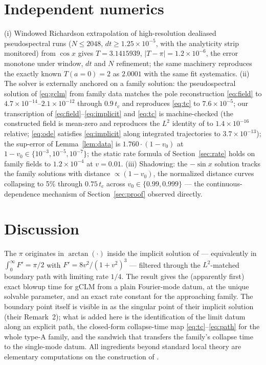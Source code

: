 \documentclass[11pt,a4paper]{article}
\theoremstyle{plain}
\theoremstyle{definition}
\theoremstyle{plain}
\newcommand{\abs}[1]{\lvert #1 \rvert}
\begin{document}
\section{Independent numerics}\label{sec:numerics}

(i) Windowed Richardson extrapolation of high-resolution dealiased pseudospectral runs ($N\le2048$, $dt\ge1.25\times10^{-5}$, with the analyticity strip monitored) from $\cos x$ gives $T=3.1415939$, $\abs{T-\pi}=1.2\times10^{-6}$, the error monotone under window, $dt$ and $N$ refinement; the same machinery reproduces the exactly known $T(a=0)=2$ as $2.0001$ with the same fit systematics. (ii) The solver is externally anchored on a family solution: the pseudospectral solution of \eqref{eq:gclm} from family data matches the pole reconstruction \eqref{eq:field} to $4.7\times10^{-14}$--$2.1\times10^{-12}$ through $0.9\,t_c$ and reproduces \eqref{eq:tc} to $7.6\times10^{-5}$; our transcription of \eqref{eq:field}--\eqref{eq:implicit} and \eqref{eq:tc} is machine-checked (the constructed field is mean-zero and reproduces the $L^2$ identity of \cite{SLSA25} to $1.4\times10^{-16}$ relative; \eqref{eq:ode} satisfies \eqref{eq:implicit} along integrated trajectories to $3.7\times10^{-13}$); the sup-error of Lemma~\ref{lem:data} is $1.760\cdot(1-v_0)$ at $1-v_0\in\{10^{-3},10^{-5},10^{-7}\}$; the static rate formula of Section~\ref{sec:rate} holds on family fields to $1.2\times10^{-4}$ at $v=0.01$. (iii) Shadowing: the $-\sin x$ solution tracks the family solutions with distance $\propto(1-v_0)$, the normalized distance curves collapsing to 5\% through $0.75\,t_c$ across $v_0\in\{0.99,0.999\}$ --- the continuous-dependence mechanism of Section~\ref{sec:proof} observed directly.

\section{Discussion}\label{sec:discussion}

The $\pi$ originates in $\arctan(\cdot)$ inside the implicit solution of \cite{SLSA25} --- equivalently in $\int_0^\infty F'=\pi/2$ with $F'=8v^2/(1+v^2)^3$ --- filtered through the $L^2$-matched boundary path with limiting rate $1/4$. The result gives the (apparently first) exact blowup time for gCLM from a plain Fourier-mode datum, at the unique solvable parameter, and an exact rate constant for the approaching family. The boundary point itself is visible in \cite{SLSA25} as the singular point of their implicit solution (their Remark~2); what is added here is the identification of the limit datum along an explicit path, the closed-form collapse-time map \eqref{eq:tc}--\eqref{eq:path} for the whole type-A family, and the sandwich that transfers the family's collapse time to the single-mode datum. All ingredients beyond standard local theory are elementary computations on the construction of \cite{SLSA25}.
\end{document}
